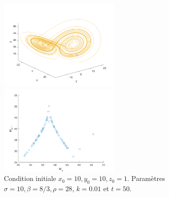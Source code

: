 \documentclass[a4paper, 12pt]{report}
\begin{document}
\begin{figure}[H]
    \centering
    \begin{minipage}[t]{6cm}
        \centering
        \includegraphics[width=6cm]{images/lorenz28.png}
    \end{minipage}\hspace{1cm}
    \begin{minipage}[t]{6cm}
        \centering
        \includegraphics[width=6cm]{images/lorenz_m_28.png}
    \end{minipage}
    \caption{Condition initiale $x_0 = 10, y_0 = 10, z_0=1$. Paramètres $\sigma=10, \beta=8/3, \rho=28$, $k=0.01$ et $t=50$.}
\end{figure}
\end{document}
